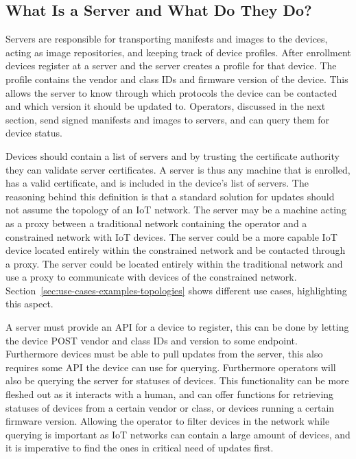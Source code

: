 \documentclass[0-thesis.tex]{subfiles}
\begin{document}
\subsection{What Is a Server and What Do They Do?}
\label{ssec:what-is-a-server}
Servers are responsible for transporting manifests and images to the devices, acting as
image repositories, and keeping track of device profiles. After enrollment devices
register at a server and the server creates a profile for that device. The profile
contains the vendor and class IDs and firmware version of the device. This allows the
server to know through which protocols the device can be contacted and which version it
should be updated to. Operators, discussed in the next section, send signed manifests and
images to servers, and can query them for device status.

Devices should contain a list of servers and by trusting the certificate authority they
can validate server certificates. A server is thus any machine that is enrolled, has a
valid certificate, and is included in the device's list of servers. The reasoning behind
this definition is that a standard solution for updates should not assume the topology of
an IoT network. The server may be a machine acting as a proxy between a traditional
network containing the operator and a constrained network with IoT devices. The server
could be a more capable IoT device located entirely within the constrained network and be
contacted through a proxy. The server could be located entirely within the traditional
network and use a proxy to communicate with devices of the constrained network.
Section~\ref{sec:use-cases-examples-topologies} shows different use cases, highlighting
this aspect.

A server must provide an API for a device to register, this can be done by letting the
device POST vendor and class IDs and version to some endpoint. Furthermore devices must be
able to pull updates from the server, this also requires some API the device can use for
querying. Furthermore operators will also be querying the server for statuses of devices.
This functionality can be more fleshed out as it interacts with a human, and can offer
functions for retrieving statuses of devices from a certain vendor or class, or devices
running a certain firmware version. Allowing the operator to filter devices in the network
while querying is important as IoT networks can contain a large amount of devices, and it
is imperative to find the ones in critical need of updates first.
\end{document}
